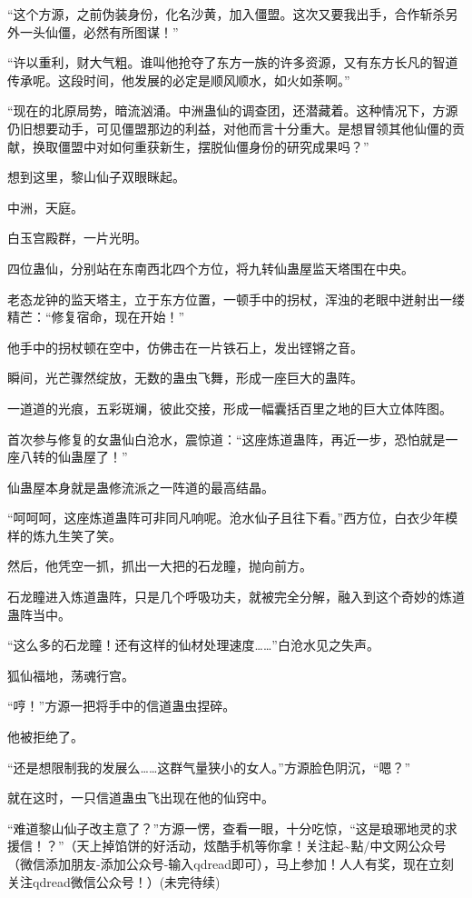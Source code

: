 \begin{this_body}
“这个方源，之前伪装身份，化名沙黄，加入僵盟。这次又要我出手，合作斩杀另外一头仙僵，必然有所图谋！”

“许以重利，财大气粗。谁叫他抢夺了东方一族的许多资源，又有东方长凡的智道传承呢。这段时间，他发展的必定是顺风顺水，如火如荼啊。”

“现在的北原局势，暗流汹涌。中洲蛊仙的调查团，还潜藏着。这种情况下，方源仍旧想要动手，可见僵盟那边的利益，对他而言十分重大。是想冒领其他仙僵的贡献，换取僵盟中对如何重获新生，摆脱仙僵身份的研究成果吗？”

想到这里，黎山仙子双眼眯起。

中洲，天庭。

白玉宫殿群，一片光明。

四位蛊仙，分别站在东南西北四个方位，将九转仙蛊屋监天塔围在中央。

老态龙钟的监天塔主，立于东方位置，一顿手中的拐杖，浑浊的老眼中迸射出一缕精芒：“修复宿命，现在开始！”

他手中的拐杖顿在空中，仿佛击在一片铁石上，发出铿锵之音。

瞬间，光芒骤然绽放，无数的蛊虫飞舞，形成一座巨大的蛊阵。

一道道的光痕，五彩斑斓，彼此交接，形成一幅囊括百里之地的巨大立体阵图。

首次参与修复的女蛊仙白沧水，震惊道：“这座炼道蛊阵，再近一步，恐怕就是一座八转的仙蛊屋了！”

仙蛊屋本身就是蛊修流派之一阵道的最高结晶。

“呵呵呵，这座炼道蛊阵可非同凡响呢。沧水仙子且往下看。”西方位，白衣少年模样的炼九生笑了笑。

然后，他凭空一抓，抓出一大把的石龙瞳，抛向前方。

石龙瞳进入炼道蛊阵，只是几个呼吸功夫，就被完全分解，融入到这个奇妙的炼道蛊阵当中。

“这么多的石龙瞳！还有这样的仙材处理速度……”白沧水见之失声。

狐仙福地，荡魂行宫。

“哼！”方源一把将手中的信道蛊虫捏碎。

他被拒绝了。

“还是想限制我的发展么……这群气量狭小的女人。”方源脸色阴沉，“嗯？”

就在这时，一只信道蛊虫飞出现在他的仙窍中。

“难道黎山仙子改主意了？”方源一愣，查看一眼，十分吃惊，“这是琅琊地灵的求援信！？”（天上掉馅饼的好活动，炫酷手机等你拿！关注起\~{}點/中文网公众号（微信添加朋友-添加公众号-输入qdread即可），马上参加！人人有奖，现在立刻关注qdread微信公众号！）(未完待续)

\end{this_body}

